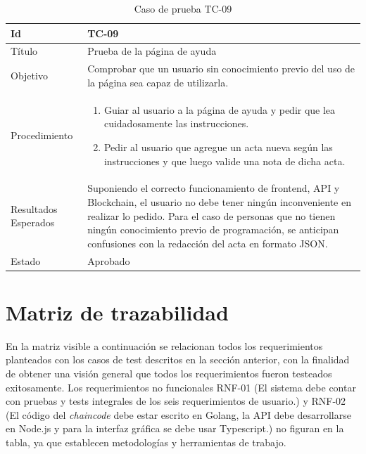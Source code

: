 \begin{table}[H]
    \begin{tabularx}{\textwidth}{|m{3cm}|X|}
    \hline
    Id & TC-09\\
    \hline
    Título & Prueba de la página de ayuda\\
    \hline
    Objetivo & Comprobar que un usuario sin conocimiento previo del uso de la página sea capaz de utilizarla.\\
    \hline
    Procedimiento & \begin{enumerate}
    \item Guiar al usuario a la página de ayuda y pedir que lea cuidadosamente las instrucciones.
    \item Pedir al usuario que agregue un acta nueva según las instrucciones y que luego valide una nota de dicha acta. 
    \end{enumerate}\\
    \hline
    Resultados Esperados & Suponiendo el correcto funcionamiento de frontend, API y Blockchain, el usuario no debe tener ningún inconveniente en realizar lo pedido. Para el caso de personas que no tienen ningún conocimiento previo de programación, se anticipan confusiones con la redacción del acta en formato JSON.\\
    \hline
    Estado & Aprobado\\
    \hline
    \end{tabularx}
    \caption{Caso de prueba TC-09}
    \end{table}
\section{Matriz de trazabilidad}
En la matriz visible a continuación se relacionan todos los requerimientos planteados con los casos de test descritos en la sección anterior, con la finalidad de obtener una visión general que todos los requerimientos fueron testeados exitosamente. Los requerimientos no funcionales RNF-01 (El sistema debe contar con pruebas y tests integrales de los seis requerimientos de usuario.) y RNF-02 (El código del \textit{chaincode} debe estar escrito en Golang, la API debe desarrollarse en Node.js y para la interfaz gráfica se debe usar Typescript.) no figuran en la tabla, ya que establecen metodologías y herramientas de trabajo.

\newcommand*\rot{\rotatebox{90}}
\newcommand*\OK{\ding{51}}


